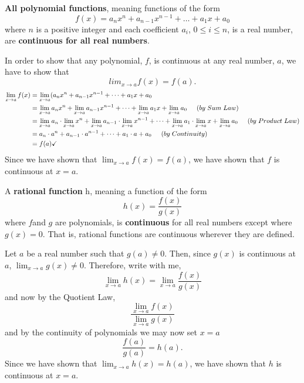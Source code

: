 \documentclass{ximera}
\begin{document}
\begin{theorem}
 \textbf{All polynomial functions}, meaning functions of the form
  \[
  f(x) = a_nx^n + a_{n-1}x^{n-1} + \dots + a_1 x + a_0
  \]
  where $n$ is a positive integer  and each coefficient $a_i$, $0\le i\le n$, is a real number, are
  \textbf{continuous for all real numbers}.
  \begin{explanation}
  In order to show that any polynomial, $f$, is continuous at any real number, $a$, we have to show that
  \[
  lim_{x\to a} f(x)=f(a).
  \]
  \begin{align*}
    \lim_{x\to a} f(x)&= \lim_{x\to a} (a_nx^n + a_{n-1}x^{n-1} + \dots + a_1 x + a_0 \\
    &= \lim_{x\to a} a_nx^n + \lim_{x\to a} a_{n-1}x^{n-1} + \dots +  \lim_{x\to a}a_1 x + \lim_{x\to a} a_0\hspace{0.2in}(by \hspace{0.04in}Sum\hspace{0.04in} Law)\\
    &= \lim_{x\to a} a_n\cdot \lim_{x\to a}x^n + \lim_{x\to a} a_{n-1}\cdot \lim_{x\to a}x^{n-1} + \dots +  \lim_{x\to a}a_1 \cdot \lim_{x\to a}x + \lim_{x\to a} a_0 \hspace{0.2in}(by \hspace{0.04in}Product\hspace{0.04in}Law)\\
    &= a_n\cdot a^n +  a_{n-1}\cdot a^{n-1} + \dots + a_1 \cdot a + a_0 \hspace{0.2in}(by \hspace{0.04in}Continuity)\\
    &=f(a)\checkmark
   \end{align*}
   Since we have shown that $\lim_{x\to a} f(x) = f(a)$, we have
      shown that $f$ is continuous at $x=a$.
  \end{explanation}
\end{theorem}

\begin{theorem}
   A \textbf{rational function} h, meaning a function of the form 
  \[
  h(x)=\frac{f(x)}{g(x)}
  \]
  where $f $and $g$ are polynomials, is \textbf{continuous} for all real numbers except where $g(x)=0$.  That is,
  rational functions are continuous wherever they are defined.
\begin{explanation}
      Let $a$ be a real number such that $g(a)\neq 0$.  Then, since
      $g(x)$ is continuous at $a$, $\lim_{x\to a} g(x) \neq 0$.
      Therefore, write with me, 
      \[
      \lim_{x \to a} h(x) = \lim_{x\to a} \frac{f(x)}{g(x)}
      \]
      and now by the Quotient Law, 
      \[
      \frac{\lim_{x\to a} f(x)}{ \lim_{x\to a} g(x)}
      \]
      and by the continuity of polynomials we may now set $x=a$
      \[
      \frac{f(a)}{g(a)}=h(a).
      \]
      Since we have shown that $\lim_{x\to a} h(x) = h(a)$, we have
      shown that $h$ is continuous at $x=a$.
\end{explanation}
\end{theorem}
\end{document}
